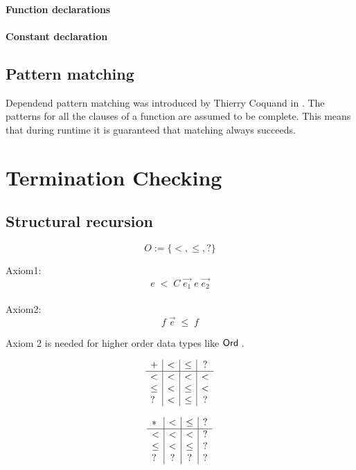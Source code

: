 \subsubsection{Function declarations}

\subsubsection{Constant declaration}

\section{Pattern matching}
Dependend pattern matching was introduced by Thierry Coquand in \cite{coquand92pattern}.
The patterns for all the clauses of a function are assumed to be complete. This means that during runtime
it is guaranteed that matching always succeeds.

\chapter{Termination Checking}

\section{Structural recursion}

\begin{definition}[Order]
\[ O := \{ < , \leq , ? \} \]
\end{definition}
Axiom1:
\[ e \; < \; C \; \vec{e_1} \; e \; \vec{e_2} \]
\\
Axiom2:
\[ f \; \vec{e} \; \leq \; f \] 

Axiom 2 is needed for higher order data types like $\mathsf{Ord}\;$.

\begin{definition}
\[
\begin{array}{l | c |c | c }

 +    &  <   &  \leq   &  ? \\
 \hline 
 <    &  <   & <       &  < \\
 \leq &  <   & \leq    &  <  \\
 ?    &  <   & \leq    &  ?
\end{array}
\]

\end{definition}


\begin{definition}
\[
\begin{array}{l | c |c | c}
 *   &  <  &  \leq & ? \\
\hline
  <   & <    & <    &   ? \\
 \leq & <    & \leq &   ?  \\
 ?    & ?    & ?    &   ?
\end{array}
\]
\end{definition}

